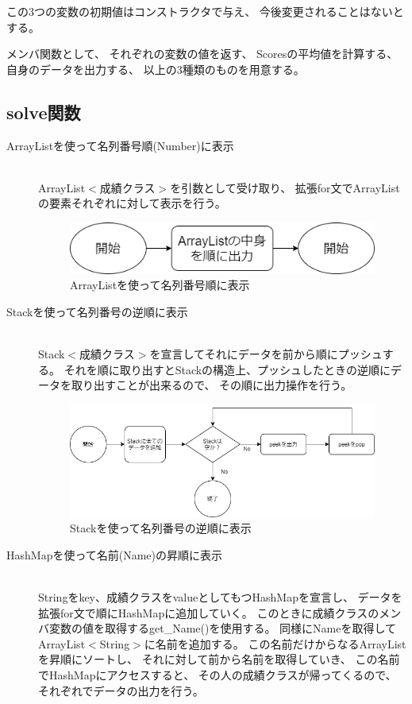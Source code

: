 \documentclass[dvipdfmx]{jsarticle}
\begin{document}
  この3つの変数の初期値はコンストラクタで与え、
  今後変更されることはないとする。

  メンバ関数として、
  それぞれの変数の値を返す、
  Scoresの平均値を計算する、
  自身のデータを出力する、
  以上の3種類のものを用意する。

  \subsection{solve関数}
  \begin{description}
    \item[ArrayListを使って名列番号順(Number)に表示]\mbox{}\\
    ArrayList$<$成績クラス$>$を引数として受け取り、
    拡張for文でArrayListの要素それぞれに対して表示を行う。

    \begin{figure}[H]
      \centering
      \includegraphics[width=0.9\hsize]{../pic/fc1.png}
      \caption{ArrayListを使って名列番号順に表示}
    \end{figure}

    \item[Stackを使って名列番号の逆順に表示]\mbox{}\\
    Stack$<$成績クラス$>$を宣言してそれにデータを前から順にプッシュする。
    それを順に取り出すとStackの構造上、プッシュしたときの逆順にデータを取り出すことが出来るので、
    その順に出力操作を行う。

    \begin{figure}[H]
      \centering
      \includegraphics[width=0.8\hsize]{../pic/fc2.png}
      \caption{Stackを使って名列番号の逆順に表示}
    \end{figure}

    \item[HashMapを使って名前(Name)の昇順に表示]\mbox{}\\
    Stringをkey、成績クラスをvalueとしてもつHashMapを宣言し、
    データを拡張for文で順にHashMapに追加していく。
    このときに成績クラスのメンバ変数の値を取得するget\_Name()を使用する。
    同様にNameを取得してArrayList$<$String$>$に名前を追加する。
    この名前だけからなるArrayListを昇順にソートし、
    それに対して前から名前を取得していき、
    この名前でHashMapにアクセスすると、
    その人の成績クラスが帰ってくるので、
    それぞれでデータの出力を行う。


\end{description}
\end{document}
